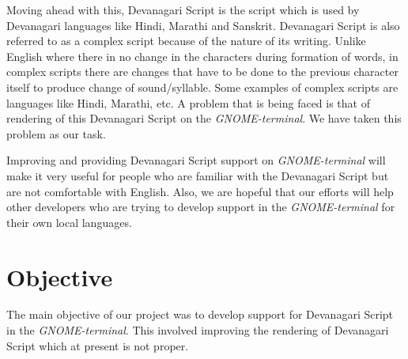 Moving ahead with this, Devanagari Script \cite{wiki1} is the script which is used by Devanagari languages like Hindi, Marathi and Sanskrit. Devanagari Script is also referred to as a complex script \cite{wiki2} because of the nature of its writing. Unlike English where there in no change in the characters during formation of words, in complex scripts there are changes that have to be done to the previous character itself to produce change of sound/syllable. Some examples of complex scripts are languages like Hindi, Marathi, etc. A problem that is being faced is that of rendering of this Devanagari Script on the \textit{GNOME-terminal}. We have taken this problem as our task.

Improving and providing Devanagari Script support on \textit{GNOME-terminal} will make it very useful for people who are familiar with the Devanagari Script but are not comfortable with English. Also, we are hopeful that our efforts will help other developers who are trying to develop support in the \textit{GNOME-terminal} for their own local languages.

\section{Objective}
The main objective of our project was to develop support for Devanagari Script in the \textit{GNOME-terminal}. This involved improving the rendering of Devanagari Script which at present is not proper.


